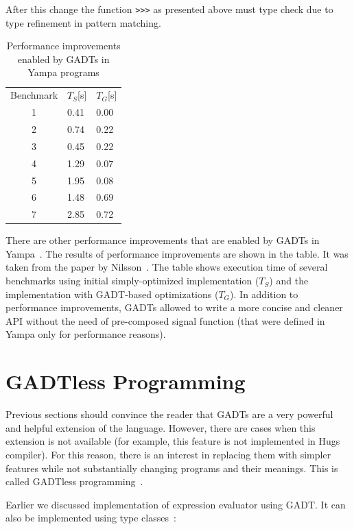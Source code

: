 \documentclass{tmr}
\begin{document}
After this change the function \verb|>|\verb|>|\verb|>| as presented above must type check due to type refinement in pattern matching.

\begin{table}[float,captionpos=b,belowcaptionskip=4pt]
\centering
\begin{tabular}{cll}
\hline\noalign{\smallskip}
Benchmark & $T_S$[s] & $T_G$[s]\\
\noalign{\smallskip}
\hline
\noalign{\smallskip}
1 & 0.41 & 0.00 \\
2 & 0.74 & 0.22 \\
3 & 0.45 & 0.22 \\
4 & 1.29 & 0.07 \\
5 & 1.95 & 0.08 \\
6 & 1.48 & 0.69 \\
7 & 2.85 & 0.72 \\
\hline
\end{tabular}
\label{tab:yampa_performance}
\caption{Performance improvements enabled by GADTs in Yampa programs}
\end{table}

There are other performance improvements that are enabled by GADTs in Yampa~\cite{yampa_gadts}. The results of performance improvements are shown in the table. It was taken from the paper by Nilsson~\cite{yampa_gadts}. The table shows execution time of several benchmarks using initial simply-optimized implementation ($T_S$) and the implementation with GADT-based optimizations ($T_G$). In addition to performance improvements, GADTs allowed to write a more concise and cleaner API without the need of pre-composed signal function (that were defined in Yampa only for performance reasons).

\section{GADTless Programming}
\label{sec:gadtless}

Previous sections should convince the reader that GADTs are a very powerful and helpful extension of the language. However, there are cases when this extension is not available (for example, this feature is not implemented in Hugs compiler). For this reason, there is an interest in replacing them with simpler features while not substantially changing programs and their meanings. This is called GADTless programming~\cite{gadtless}.

Earlier we discussed implementation of expression evaluator using GADT. It can also be implemented using type classes~\cite{finally_tagless}:
\end{document}
